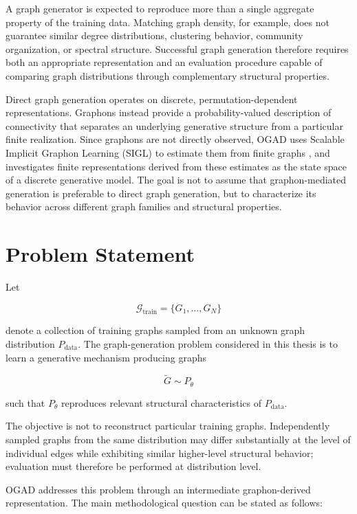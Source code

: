 A graph generator is expected to reproduce more than a single aggregate property of the training data. Matching graph density, for example, does not guarantee similar degree distributions, clustering behavior, community organization, or spectral structure. Successful graph generation therefore requires both an appropriate representation and an evaluation procedure capable of comparing graph distributions through complementary structural properties.

Direct graph generation operates on discrete, permutation-dependent representations. Graphons instead provide a probability-valued description of connectivity that separates an underlying generative structure from a particular finite realization. Since graphons are not directly observed, OGAD uses Scalable Implicit Graphon Learning (SIGL) to estimate them from finite graphs \cite{azizpour2025scalable}, and investigates finite representations derived from these estimates as the state space of a discrete generative model. The goal is not to assume that graphon-mediated generation is preferable to direct graph generation, but to characterize its behavior across different graph families and structural properties.


\section{Problem Statement}
\label{sec:intro_problem}

Let

\[
\mathcal{G}_{\mathrm{train}}=\{G_1,\ldots,G_N\}
\]

denote a collection of training graphs sampled from an unknown graph distribution \(P_{\mathrm{data}}\). The graph-generation problem considered in this thesis is to learn a generative mechanism producing graphs

\[
\widetilde{G}\sim P_{\theta}
\]

such that \(P_{\theta}\) reproduces relevant structural characteristics of \(P_{\mathrm{data}}\).

The objective is not to reconstruct particular training graphs. Independently sampled graphs from the same distribution may differ substantially at the level of individual edges while exhibiting similar higher-level structural behavior; evaluation must therefore be performed at distribution level.

OGAD addresses this problem through an intermediate graphon-derived representation. The main methodological question can be stated as follows:

